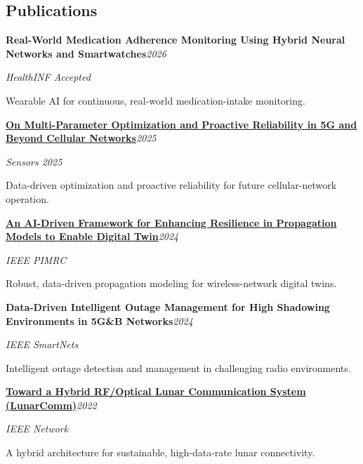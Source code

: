 \documentclass[9pt,letterpaper]{extarticle}
\newcommand{\entry}[2]{\Needspace{4\baselineskip}\textbf{#1}\hfill\textit{#2}\par}
\begin{document}
\subsection{Publications}
\entry{Real-World Medication Adherence Monitoring Using Hybrid Neural Networks and Smartwatches}{2026}
\textit{HealthINF \textbar{} Accepted}\par
Wearable AI for continuous, real-world medication-intake monitoring.\par
\entry{\href{https://doi.org/10.3390/s25247651}{On Multi-Parameter Optimization and Proactive Reliability in 5G and Beyond Cellular Networks}}{2025}
\textit{Sensors 2025}\par
Data-driven optimization and proactive reliability for future cellular-network operation.\par
\entry{\href{https://doi.org/10.1109/PIMRC59610.2024.10817403}{An AI-Driven Framework for Enhancing Resilience in Propagation Models to Enable Digital Twin}}{2024}
\textit{IEEE PIMRC}\par
Robust, data-driven propagation modeling for wireless-network digital twins.\par
\entry{Data-Driven Intelligent Outage Management for High Shadowing Environments in 5G\&B Networks}{2024}
\textit{IEEE SmartNets}\par
Intelligent outage detection and management in challenging radio environments.\par
\entry{\href{https://arxiv.org/abs/2203.15899}{Toward a Hybrid RF/Optical Lunar Communication System (LunarComm)}}{2022}
\textit{IEEE Network}\par
A hybrid architecture for sustainable, high-data-rate lunar connectivity.\par
{}
\end{document}
